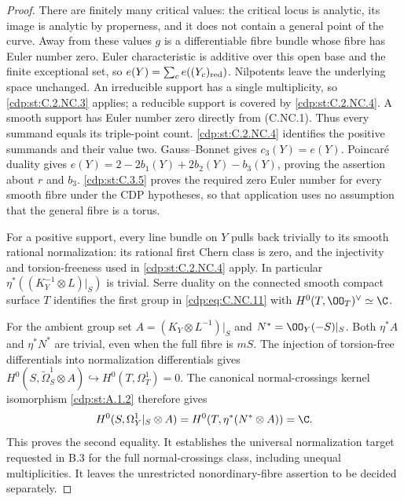 \begin{proof}
There are finitely many critical values: the critical locus is analytic, its image is analytic by properness, and it does not contain a general point of the curve. Away from these values $g$ is a differentiable fibre bundle whose fibre has Euler number zero. Euler characteristic is additive over this open base and the finite exceptional set, so $e(Y)=\sum_c e((Y_c)_{\rm red})$. Nilpotents leave the underlying space unchanged. An irreducible support has a single multiplicity, so \ref{cdp:st:C.2.NC.3} applies; a reducible support is covered by \ref{cdp:st:C.2.NC.4}. A smooth support has Euler number zero directly from (C.NC.1). Thus every summand equals its triple-point count. \ref{cdp:st:C.2.NC.4} identifies the positive summands and their value two. Gauss--Bonnet gives $c_3(Y)=e(Y)$. Poincaré duality gives $e(Y)=2-2b_1(Y)+2b_2(Y)-b_3(Y)$, proving the assertion about $r$ and $b_3$. \ref{cdp:st:C.3.5} proves the required zero Euler number for every smooth fibre under the CDP hypotheses, so that application uses no assumption that the general fibre is a torus.

For a positive support, every line bundle on $Y$ pulls back trivially to its smooth rational normalization: its rational first Chern class is zero, and the injectivity and torsion-freeness used in \ref{cdp:st:C.2.NC.4} apply. In particular $\eta^*((K_Y^{-1}\otimes L)|_S)$ is trivial. Serre duality on the connected smooth compact surface $T$ identifies the first group in \eqref{cdp:eq:C.NC.11} with $H^0(T,\OO_T)^\vee\simeq\C$.

For the ambient group set $A=(K_Y\otimes L^{-1})|_S$ and $N^*=\OO_Y(-S)|_S$. Both $\eta^*A$ and $\eta^*N^*$ are trivial, even when the full fibre is $mS$. The injection of torsion-free differentials into normalization differentials gives
$H^0(S,\widetilde\Omega_S^1\otimes A)\hookrightarrow H^0(T,\Omega_T^1)=0$.
The canonical normal-crossings kernel isomorphism \ref{cdp:st:A.1.2} therefore gives
\[
 H^0(S,\Omega_Y^1|_S\otimes A)
 =H^0(T,\eta^*(N^*\otimes A))=\C.
\]
This proves the second equality. It establishes the universal normalization target requested in B.3 for the full normal-crossings class, including unequal multiplicities. It leaves the unrestricted nonordinary-fibre assertion to be decided separately.
\end{proof}


